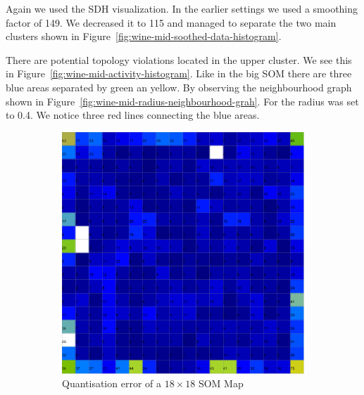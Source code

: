 \documentclass{acm_proc_article-sp}
\begin{document}
Again we used the SDH visualization. In the earlier settings we used a smoothing factor of 149. We decreased it to
115 and managed to separate the two main clusters shown in Figure~\ref{fig:wine-mid-soothed-data-histogram}.

There are potential topology violations located in the upper cluster. We see this in Figure~\ref{fig:wine-mid-activity-histogram}.
Like in the big SOM there are three blue areas separated by green an yellow. By observing the neighbourhood graph
shown in Figure~\ref{fig:wine-mid-radius-neighbourhood-grah}. For the radius was set to 0.4. We notice three red lines connecting the blue areas.


\begin{figure}
\centering
\begin{subfigure}[b]{0.45\linewidth}
    \includegraphics[width=\linewidth]{img/wine-mid-quant-error}
    \caption{Quantisation error of a $18\times18$ SOM Map}
    \label{fig:wine-mid-quant-error}
\end{subfigure}
\begin{subfigure}[b]{0.45\linewidth}

\end{subfigure}
\end{figure}
\end{document}
